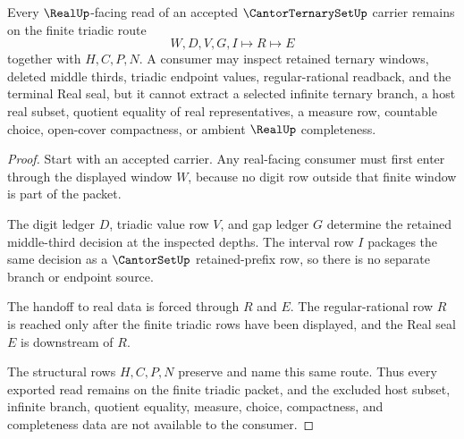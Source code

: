 \begin{theorem}
\label{thm:cantor-ternary-set-triadic-nonescape}
Every $\RealUp$-facing read of an accepted $\CantorTernarySetUp$ carrier remains on the finite triadic route
$$
W,D,V,G,I\longmapsto R\longmapsto E
$$
together with $H,C,P,N$. A consumer may inspect retained ternary windows, deleted middle thirds, triadic endpoint values, regular-rational readback, and the terminal Real seal, but it cannot extract a selected infinite ternary branch, a host real subset, quotient equality of real representatives, a measure row, countable choice, open-cover compactness, or ambient $\RealUp$ completeness.
\end{theorem}
\begin{proof}
Start with an accepted carrier. Any real-facing consumer must first enter through the displayed window $W$, because no digit row outside that finite window is part of the packet.

The digit ledger $D$, triadic value row $V$, and gap ledger $G$ determine the retained middle-third decision at the inspected depths. The interval row $I$ packages the same decision as a $\CantorSetUp$ retained-prefix row, so there is no separate branch or endpoint source.

The handoff to real data is forced through $R$ and $E$. The regular-rational row $R$ is reached only after the finite triadic rows have been displayed, and the Real seal $E$ is downstream of $R$.

The structural rows $H,C,P,N$ preserve and name this same route. Thus every exported read remains on the finite triadic packet, and the excluded host subset, infinite branch, quotient equality, measure, choice, compactness, and completeness data are not available to the consumer.
\end{proof}

